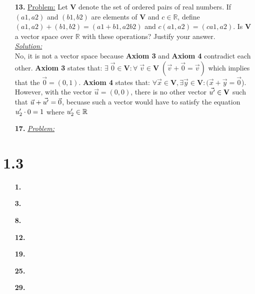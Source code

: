 \documentclass[11pt, fleqn]{article}
\newcommand{\vectSpace}[0]{\mathbf{V}}
\begin{document}
\begin{itemize}
    \item [\textbf{13.}]
    {\underline{Problem:} Let $\mathbf{V}$ denote the set of ordered pairs of real numbers. If $(a1,a2)$ and $(b1, b2)$ are elements of $\mathbf{V}$ and $c \in \mathbb{R}$, define $(a1, a2) + (b1,b2) = (a1 + b1, a2b2)$ and $c(a1,a2) = (ca1,a2)$. Is $\mathbf{V}$ a vector space over $\mathbb{R}$ with these operations? Justify your answer.}\\[2ex]\textit{\underline{Solution:}}\\
    	No, it is not a vector space because \textbf{Axiom 3} and \textbf{Axiom 4} contradict each other. \textbf{Axiom 3} states that: $\exists\;\vec{0} \in \vectSpace : \forall \; \vec{v} \in \vectSpace \;(\vec{v} + \vec{0} = \vec{v})$ which implies that the $\vec{0} = (0, 1)$. \textbf{Axiom 4} states that: $\forall\vec{x} \in \vectSpace, \exists \vec{y} \in \vectSpace : (\vec{x}  + \vec{y}  = \vec{0}$). However, with the vector $\vec{u} = (0, 0)$, there is no other vector $\vec{u\rq} \in \vectSpace$ such that $\vec{u} + \vec{u\rq} = \vec{0}$, becuase such a vector would have to satisfy the equation $u\rq_2 \cdot 0 = 1$ where $u\rq_2 \in \mathbb{R}$
    
    \item [\textbf{17.}]
    \textit{\underline{Problem:} }
\end{itemize}

\section*{1.3}
\begin{itemize}
    \setlength\itemsep{5ex}
    \item [\textbf{1.}]
    \item [\textbf{3.}]
    \item [\textbf{8.}]
    \item [\textbf{12.}]
    \item [\textbf{19.}]
    \item [\textbf{25.}]
    \item [\textbf{29.}]
\end{itemize}
\end{document}
